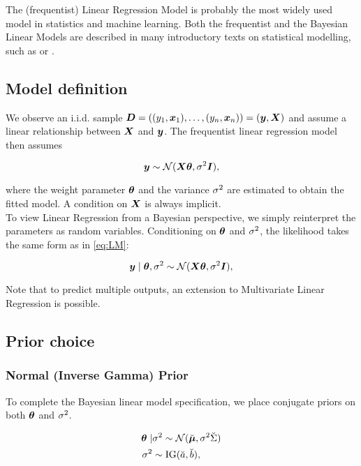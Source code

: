 The (frequentist) Linear Regression Model is probably the most widely used model in statistics and machine learning.
Both the frequentist and the Bayesian Linear Models are described in many introductory texts on statistical modelling, such as \citet{fahrmeir_regression_2021} or \citet{gelman_bayesian_2013}.


\subsection{Model definition}

We observe an i.i.d. sample $\bm{D} = ((y_1, \bm{x}_1), \dots, (y_n, \bm{x}_n))= (\bm{y}, \bm{X})$ and assume a linear relationship between $\bm{X}$ and $\bm{y}$.
The frequentist linear regression model then assumes

\begin{equation} \label{eq:LM}
    \bm{y} \sim \mathcal{N}(\bm{X} \bm{\theta}, \sigma^2 \bm{I}),
\end{equation}

where the weight parameter $\bm{\theta}$ and the variance $\sigma^2$ are estimated to obtain the fitted model.
A condition on $\bm{X}$ is always implicit.\\

To view Linear Regression from a Bayesian perspective, we simply reinterpret the parameters as random variables.
Conditioning on $\bm{\theta}$ and $\sigma^2$, the likelihood takes the same form as in \eqref{eq:LM}:

\begin{equation} \label{eq:BLM}
    \bm{y} \mid \bm{\theta}, \sigma^2 \sim \mathcal{N}(\bm{X} \bm{\theta}, \sigma^2 \bm{I}), 
\end{equation}

Note that to predict multiple outputs, an extension to Multivariate Linear Regression is possible.

\subsection{Prior choice}
\subsubsection*{Normal (Inverse Gamma) Prior}

To complete the Bayesian linear model specification, we place conjugate priors on both $\bm{\theta}$ and $\sigma^2$.

\begin{equation} \label{eq:NIGprior}
    \begin{aligned}
        \bm{\theta} \mid &\sigma^2 \sim  \mathcal{N}(\breve{\bm{\mu}}, \sigma^2 \breve{\Sigma}) \\
        \sigma^2 &\sim \text{IG}(\breve{a}, \breve{b}),
    \end{aligned}
\end{equation}

